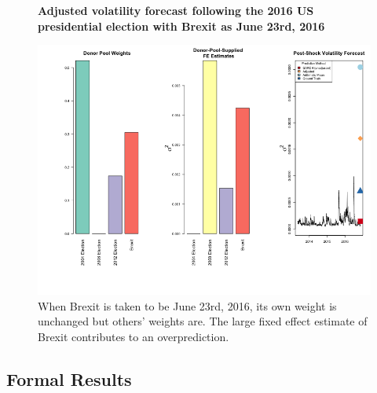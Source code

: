 \documentclass[11pt,3p,review,authoryear]{elsarticle}
\theoremstyle{definition}
\begin{document}
  \begin{figure}[H]
    \begin{center}
      \textbf{Adjusted volatility forecast following the 2016 US presidential election with Brexit as June 23rd, 2016}\par\medskip
      \includegraphics[scale=.6]{real_data_output_plots/WedJun121222522024_IYG_None_None.png}
      \caption{When Brexit is taken to be June 23rd, 2016, its own weight is unchanged but others' weights are.  The large fixed effect estimate of Brexit contributes to an overprediction.}
      \label{fig:SVF_2016_with_Brexit_06-23}
      \end{center}
    \end{figure}

\subsection{Formal Results}
\end{document}
